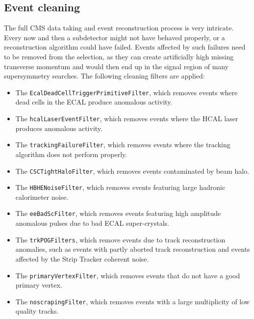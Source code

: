 



\subsection{Event cleaning \label{sec:event_cleaning}}

The full CMS data taking and event reconstruction process is very intricate. Every now and then a
subdetector might not have behaved properly, or a reconstruction algorithm could have failed. 
Events affected by such failures need to be removed from the selection, as they can create
artificially high missing transverse momentum and would then end up in the signal region of many
supersymmetry searches. 
The following cleaning filters are applied:

\begin{itemize}
\item The {\tt EcalDeadCellTriggerPrimitiveFilter}, which removes events where dead cells in the
ECAL produce anomalous activity.
\item The {\tt hcalLaserEventFilter}, which removes events where the HCAL laser produces anomalous
activity.
\item The {\tt trackingFailureFilter}, which removes events where the tracking algorithm does not
perform properly.
\item The {\tt CSCTightHaloFilter}, which removes events contaminated by beam halo.
\item The {\tt HBHENoiseFilter}, which removes events featuring large hadronic calorimeter noise.
\item The {\tt eeBadScFilter}, which removes events featuring high amplitude anomalous pulses due
to bad ECAL super-crystals.
\item The {\tt trkPOGFilters}, which remove events due to track reconstruction anomalies, such as
events with partly aborted track reconstruction and events affected by the Strip Tracker coherent
noise.
\item The {\tt primaryVertexFilter}, which removes events that do not have a good primary vertex.
\item The {\tt noscrapingFilter}, which removes events with a large multiplicity of low quality
tracks.
\end{itemize}


